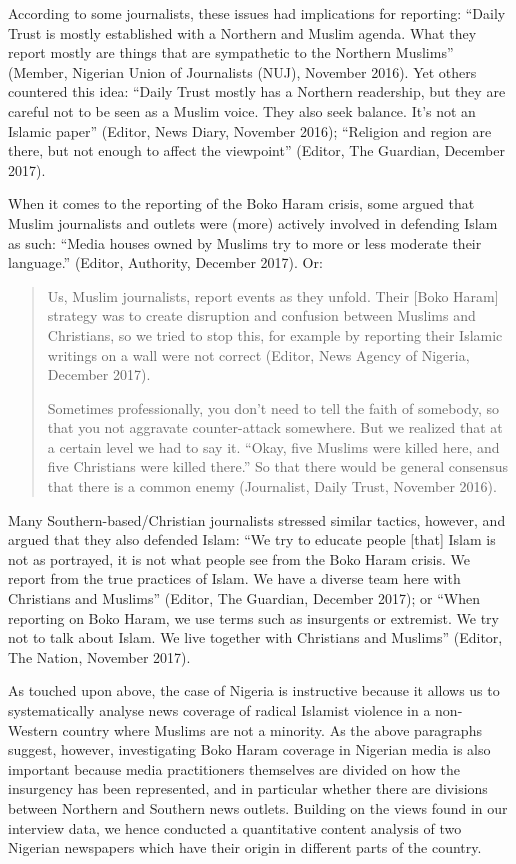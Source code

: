 According to some journalists, these issues had implications for reporting: ``Daily Trust is mostly established with a Northern and Muslim agenda. What they report mostly are things that are sympathetic to the Northern Muslims'' (Member, Nigerian Union of Journalists (NUJ), November 2016). Yet others countered this idea: ``Daily Trust mostly has a Northern readership, but they are careful not to be seen as a Muslim voice. They also seek balance. It's not an Islamic paper'' (Editor, News Diary, November 2016); ``Religion and region are there, but not enough to affect the viewpoint'' (Editor, The Guardian, December 2017).


When it comes to the reporting of the Boko Haram crisis, some argued that Muslim journalists and outlets were (more) actively involved in defending Islam as such: ``Media houses owned by Muslims try to more or less moderate their language.'' (Editor, Authority, December 2017). Or: 

\begin{quote}
Us, Muslim journalists, report events as they unfold. Their [Boko Haram] strategy was to create disruption and confusion between Muslims and Christians, so we tried to stop this, for example by reporting their Islamic writings on a wall were not correct (Editor, News Agency of Nigeria, December 2017). 

Sometimes professionally, you don't need to tell the faith of somebody, so that you not aggravate counter-attack somewhere. But we realized that at a certain level we had to say it. ``Okay, five Muslims were killed here, and five Christians were killed there.'' So that there would be general consensus that there is a common enemy (Journalist, Daily Trust, November 2016).
\end{quote}


Many Southern-based/Christian journalists stressed similar tactics, however, and argued that they also defended Islam: ``We try to educate people [that] Islam is not as portrayed, it is not what people see from the Boko Haram crisis. We report from the true practices of Islam. We have a diverse team here with Christians and Muslims'' (Editor, The Guardian, December 2017); or ``When reporting on Boko Haram, we use terms such as insurgents or extremist. We try not to talk about Islam. We live together with Christians and Muslims'' (Editor, The Nation, November 2017).


As touched upon above, the case of Nigeria is instructive because it allows us to systematically analyse news coverage of radical Islamist violence in a non-Western country where Muslims are not a minority. As the above paragraphs suggest, however, investigating Boko Haram coverage in Nigerian media is also important because media practitioners themselves are divided on how the insurgency has been represented, and in particular whether there are divisions between Northern and Southern news outlets. Building on the views found in our interview data, we hence conducted a quantitative content analysis of two Nigerian newspapers which have their origin in different parts of the country.


